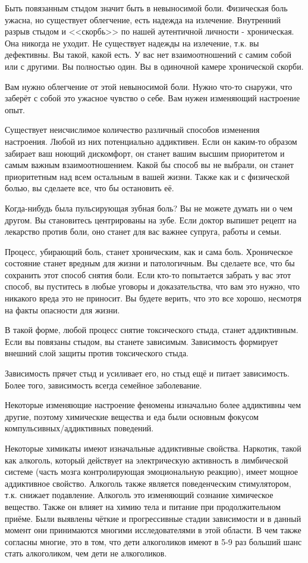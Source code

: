 \documentclass[10pt, fleqn]{article}
\begin{document}
Быть повязанным стыдом значит быть в невыносимой боли. Физическая боль ужасна, но существует облегчение, есть надежда на излечение. Внутренний разрыв стыдом и <<скорбь>> по нашей аутентичной личности - хроническая. Она никогда не уходит. Не существует надежды на излечение, т.к. вы дефективны. Вы такой, какой есть. У вас нет взаимоотношений с самим собой или с другими. Вы полностью один. Вы в одиночной камере хронической скорби.

Вам нужно облегчение от этой невыносимой боли. Нужно что-то снаружи, что заберёт с собой это ужасное чувство о себе. Вам нужен изменяющий настроение опыт.

Существует неисчислимое количество различный способов изменения настроения. Любой из них потенциально аддиктивен. Если он каким-то образом забирает ваш ноющий дискомфорт, он станет вашим высшим приоритетом и самым важным взаимоотношением. Какой бы способ вы не выбрали, он станет приоритетным над всем остальным в вашей жизни. Также как и с физической болью, вы сделаете все, что бы остановить её.

Когда-нибудь была пульсирующая зубная боль? Вы не можете думать ни о чем другом. Вы становитесь центрированы на зубе. Если доктор выпишет рецепт на лекарство против боли, оно станет для вас важнее супруга, работы и семьи.

Процесс, убирающий боль, станет хроническим, как и сама боль. Хроническое состояние станет вредным для жизни и патологичным. Вы сделаете все, что бы сохранить этот способ снятия боли. Если кто-то попытается забрать у вас этот способ, вы пуститесь в любые уговоры и доказательства, что вам это нужно, что никакого вреда это не приносит. Вы будете верить, что это все хорошо, несмотря на факты опасности для жизни.

В такой форме, любой процесс снятие токсического стыда, станет аддиктивным. Если вы повязаны стыдом, вы станете зависимым. Зависимость формирует внешний слой защиты против токсического стыда.

Зависимость прячет стыд и усиливает его, но стыд ещё и питает зависимость. Более того, зависимость всегда семейное заболевание.



Некоторые изменяющие настроение феномены изначально более аддиктивны чем другие, поэтому химические вещества и еда были основным фокусом компульсивных/аддиктивных поведений.


Некоторые химикаты имеют изначальные аддиктивные свойства. Наркотик, такой как алкоголь, который действует на электрическую активность в лимбической системе (часть мозга контролирующая эмоциональную реакцию), имеет мощное аддиктивное свойство. Алкоголь также является поведенческим стимулятором, т.к. снижает подавление. Алкоголь это изменяющий сознание химическое вещество. Также он влияет на химию тела и питание при продолжительном приёме. Были выявлены чёткие и прогрессивные стадии зависимости и в данный момент они принимаются многими исследователями в этой области. В чем также согласны многие, это в том, что дети алкоголиков имеют в 5-9 раз больший шанс стать алкоголиком, чем дети не алкоголиков.
\end{document}
